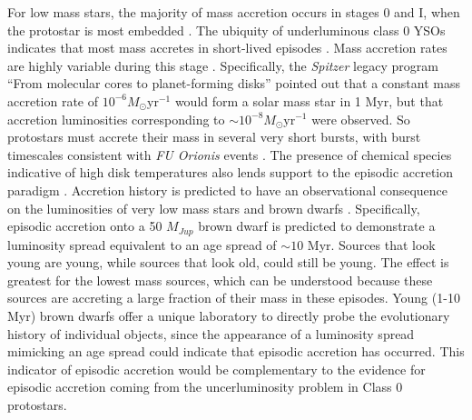 For low mass stars, the majority of mass accretion occurs in stages 0 and I, when the protostar is most embedded \citep{2007ARA&A..45..565M,2014prpl.conf..195D}.  The ubiquity of underluminous class 0 YSOs indicates that most mass accretes in short-lived episodes \citep{2008ApJS..179..249D}.  Mass accretion rates are highly variable during this stage \citep{2006ApJ...650..956V,2009ApJ...702L..27B,2014prpl.conf..387A}.  Specifically, the \emph{Spitzer} legacy program ``From molecular cores to planet-forming disks'' \citep[][\emph{c2d}]{2009ApJS..181..321E} pointed out that a constant mass accretion rate of $10^{-6} M_{\odot}\mathrm{yr}^{-1}$ would form a solar mass star in 1 Myr, but that accretion luminosities corresponding to $\sim10^{-8} M_{\odot}\mathrm{yr}^{-1}$ were observed.  So protostars must accrete their mass in several very short bursts, with burst timescales consistent with \emph{FU Orionis} events \citep{2014prpl.conf..195D}.  The presence of chemical species indicative of high disk temperatures also lends support to the episodic accretion paradigm \citep{2012ApJ...754L..18V}.  Accretion history is predicted to have an observational consequence on the luminosities of very low mass stars and brown dwarfs \citep{2009ApJ...702L..27B,2011ApJ...730...32S}.  Specifically, episodic accretion onto a 50 $M_{Jup}$ brown dwarf is predicted to demonstrate a luminosity spread equivalent to an age spread of $\sim10$ Myr.  Sources that look young are young, while sources that look old, could still be young.  The effect is greatest for the lowest mass sources, which can be understood because these sources are accreting a large fraction of their mass in these episodes.  Young (1-10 Myr) brown dwarfs offer a unique laboratory to directly probe the evolutionary history of individual objects, since the appearance of a luminosity spread mimicking an age spread could indicate that episodic accretion has occurred.  This indicator of episodic accretion would be complementary to the evidence for episodic accretion coming from the uncerluminosity problem in Class 0 protostars.



